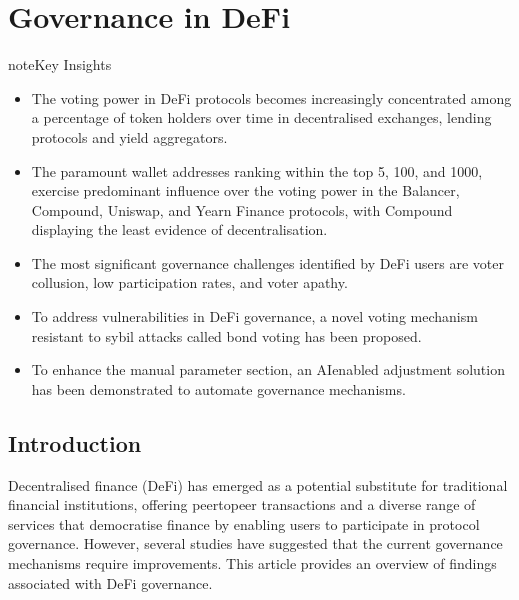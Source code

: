 \documentclass[letterpaper,10pt,english]{jupyterBook}
\begin{document}
\section{Governance in DeFi}
\label{\detokenize{GOV/gov:governance-in-defi}}\label{\detokenize{GOV/gov::doc}}


\sphinxAtStartPar
{}

\begin{sphinxadmonition}{note}{Key Insights}
\begin{itemize}
\item {} 
\sphinxAtStartPar
The voting power in DeFi protocols becomes increasingly concentrated among a percentage of token holders over time in decentralised exchanges, lending protocols and yield aggregators.

\item {} 
\sphinxAtStartPar
The paramount wallet addresses ranking within the top 5, 100, and 1000, exercise predominant influence over the voting power in the Balancer, Compound, Uniswap, and Yearn Finance protocols, with Compound displaying the least evidence of decentralisation.

\item {} 
\sphinxAtStartPar
The most significant governance challenges identified by DeFi users are voter collusion, low participation rates, and voter apathy.

\item {} 
\sphinxAtStartPar
To address vulnerabilities in DeFi governance, a novel voting mechanism resistant to sybil attacks called bond voting has been proposed.

\item {} 
\sphinxAtStartPar
To enhance the manual parameter section, an AI\sphinxhyphen{}enabled adjustment solution has been demonstrated to automate governance mechanisms.

\end{itemize}
\end{sphinxadmonition}


\subsection{Introduction}
\label{\detokenize{GOV/gov:introduction}}
\sphinxAtStartPar
Decentralised finance (DeFi) has emerged as a potential substitute for traditional financial institutions, offering peer\sphinxhyphen{}to\sphinxhyphen{}peer transactions and a diverse range of services that democratise finance by enabling users to participate in protocol governance. However, several studies have suggested that the current governance mechanisms require improvements. This article provides an overview of findings associated with DeFi governance.
\end{document}
